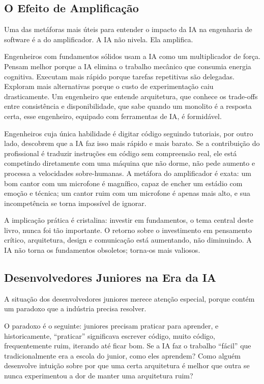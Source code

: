 \subsection{O Efeito de Amplificação}

Uma das metáforas mais úteis para entender o impacto da IA na engenharia de software é a do amplificador. A IA não nivela. Ela amplifica.

Engenheiros com fundamentos sólidos usam a IA como um multiplicador de força. Pensam melhor porque a IA elimina o trabalho mecânico que consumia energia cognitiva. Executam mais rápido porque tarefas repetitivas são delegadas. Exploram mais alternativas porque o custo de experimentação caiu drasticamente. Um engenheiro que entende arquitetura, que conhece os trade-offs entre consistência e disponibilidade, que sabe quando um monolito é a resposta certa, esse engenheiro, equipado com ferramentas de IA, é formidável.

Engenheiros cuja única habilidade é digitar código seguindo tutoriais, por outro lado, descobrem que a IA faz isso mais rápido e mais barato. Se a contribuição do profissional é traduzir instruções em código sem compreensão real, ele está competindo diretamente com uma máquina que não dorme, não pede aumento e processa a velocidades sobre-humanas. A metáfora do amplificador é exata: um bom cantor com um microfone é magnífico, capaz de encher um estádio com emoção e técnica; um cantor ruim com um microfone é apenas mais alto, e sua incompetência se torna impossível de ignorar.

A implicação prática é cristalina: investir em fundamentos, o tema central deste livro, nunca foi tão importante. O retorno sobre o investimento em pensamento crítico, arquitetura, design e comunicação está aumentando, não diminuindo. A IA não torna os fundamentos obsoletos; torna-os mais valiosos.

\subsection{Desenvolvedores Juniores na Era da IA}

A situação dos desenvolvedores juniores merece atenção especial, porque contém um paradoxo que a indústria precisa resolver.

O paradoxo é o seguinte: juniores precisam praticar para aprender, e historicamente, ``praticar'' significava escrever código, muito código, frequentemente ruim, iterando até ficar bom. Se a IA faz o trabalho ``fácil'' que tradicionalmente era a escola do junior, como eles aprendem? Como alguém desenvolve intuição sobre por que uma certa arquitetura é melhor que outra se nunca experimentou a dor de manter uma arquitetura ruim?

